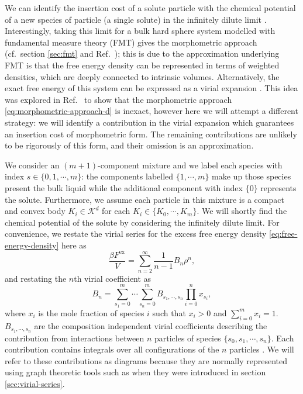 \documentclass[11pt,twoside]{report}
\begin{document}
We can identify the insertion cost of a solute particle with the chemical potential of a new species of particle (a single solute) in the infinitely dilute limit \cite{ReissJCP1959,Hansen-GoosJPCM2006,Hansen-GoosJCP2014}.
Interestingly, taking this limit for a bulk hard sphere system modelled with fundamental measure theory (FMT) gives the morphometric approach (cf.\ section \ref{sec:fmt} and Ref.\ \cite{Hansen-GoosJPCM2006}); this is due to the approximation underlying FMT is that the free energy density can be represented in terms of weighted densities, which are deeply connected to intrinsic volumes.
Alternatively, the exact free energy of this system can be expressed as a virial expansion \cite{Hansen2013}.
This idea was explored in Ref.\ \cite{Hansen-GoosJPCM2006} to show that the morphometric approach \eqref{eq:morphometric-approach-d} is inexact, however here we will attempt a different strategy: we will identify a contribution in the virial expansion which guarantees an insertion cost of morphometric form.
The remaining contributions are unlikely to be rigorously of this form, and their omission is an approximation.

We consider an $(m+1)$-component mixture and we label each species with index $s \in \{0, 1, \cdots, m\}$: the components labelled $\{1, \cdots, m\}$ make up those species present the bulk liquid while the additional component with index $\{0\}$ represents the solute.
Furthermore, we assume each particle in this mixture is a compact and convex body $K_i \in \mathcal{K}^d$ for each $K_i \in \{K_0, \cdots, K_m\}$.
We will shortly find the chemical potential of the solute by considering the infinitely dilute limit.
For convenience, we restate the virial series for the excess free energy density \eqref{eq:free-energy-density} here as
\begin{equation}
  \frac{\beta F^\mathrm{ex}}{V}
  =
  \sum_{n=2}^\infty
  \frac{1}{n-1}
  B_n
  \rho^n,
\end{equation}
and restating the $n$th virial coefficient \label{eq:virial-coefficients-mixtures} as
\begin{equation}
  B_n
  =
  \sum_{s_1=0}^m \cdots \sum_{s_n=0}^m
  B_{s_1, \cdots, s_n} \prod_{i=0}^n x_{s_i},
\end{equation}
where $x_i$ is the mole fraction of species $i$ such that $x_i > 0$ and $\sum_{i=0}^m x_i = 1$.
$B_{s_1, \cdots, s_n}$ are the composition independent virial coefficients describing the contribution from interactions between $n$ particles of species $\{s_0, s_1, \cdots, s_n\}$.
Each contribution contains integrals over all configurations of the $n$ particles \cite{Hansen2013,Santos2016}.
We will refer to these contributions as diagrams because they are normally represented using graph theoretic tools such as when they were introduced in section \ref{sec:virial-series}.
\end{document}
